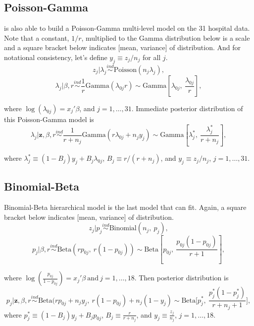 \documentclass[article]{jss}
\begin{document}
\subsection[Poisson-Gamma]{Poisson-Gamma}
 is also able to build a Poisson-Gamma multi-level model on the 31 hospital data. Note that a constant, $1/r$, multiplied to the Gamma distribution below is a scale and a square bracket below indicates [mean, variance] of distribution. And for notational consistency, let's define $y_{j}\equiv z_{j} / n_{j}$ for all $j$.
\begin{equation}
z_{j}\vert \lambda_{j} \stackrel{ind}{\sim}\textrm{Poisson}(n_{j}\lambda_{j}),
\end{equation}
\begin{equation}
\lambda_{j}\vert \beta, r\stackrel{ind}{\sim}\frac{1}{r}\textrm{Gamma}(\lambda_{0j}r)\sim \textrm{Gamma}[\lambda_{0j}, ~\frac{\lambda_{0j}}{r}],
\end{equation}

where $\log(\lambda_{0j}) =x_{j}'\beta$, and $j=1, \ldots, 31$. Immediate posterior distribution of this Poisson-Gamma model is
\begin{equation}
\lambda_{j}\vert \textbf{z}, \beta, r \stackrel{ind}{\sim}\frac{1}{r + n_{j}}\textrm{Gamma}(r\lambda_{0j} + n_{j}y_{j})\sim\textrm{Gamma}[\lambda^{\ast}_{j},~\frac{\lambda^{\ast}_{j}}{r+n_{j}}],
\end{equation}

where $\lambda^{\ast}_{j} \equiv (1-B_{j})y_{j} + B_{j}\lambda_{0j}$,  $B_{j}\equiv r / (r+n_{j})$, and $y_{j}\equiv z_{j} / n_{j}$, $j=1, \ldots, 31$. 

\subsection[Binomial-Beta]{Binomial-Beta}
Binomial-Beta hierarchical model is the last model that  can fit. Again, a square bracket below indicates [mean, variance] of distribution.
\begin{equation}
z_{j} \vert p_{j}\stackrel{ind}{\sim}\textrm{Binomial}(n_{j}, ~p_{j}),
\end{equation}
\begin{equation}
p_{j} \vert \beta, r\stackrel{ind}{\sim}\textrm{Beta}(rp_{0j},~ r(1-p_{0j}))\sim \textrm{Beta}[p_{0j}, ~\frac{p_{0j}(1-p_{0j})}{r + 1}],
\end{equation}

where $\log(\frac{p_{0j}}{1-p_{0j}}) =x_{j}'\beta~\textrm{and}~j=1, \ldots, 18$. Then posterior distribution is
\begin{equation}
p_{j}\vert \textbf{z}, \beta, r \stackrel{ind}{\sim}\textrm{Beta}(rp_{0j}+n_{j}y_{j},~r(1-p_{0j})+n_{j}(1-y_{j})\sim\textrm{Beta}\bigg[p^{\ast}_{j},~ \frac{p^{\ast}_{j}(1-p^{\ast}_{j})}{r+n_{j}+1}\bigg],
\end{equation}
where $p^{\ast}_{j}\equiv(1-B_{j})y_{j}+B_{j}p_{0j}$, $B_{j}\equiv\frac{r}{r+n_{j}}$, and $y_{j}\equiv\frac{z_{j}}{n_{j}}$, $j=1,\ldots,18$.
\end{document}
